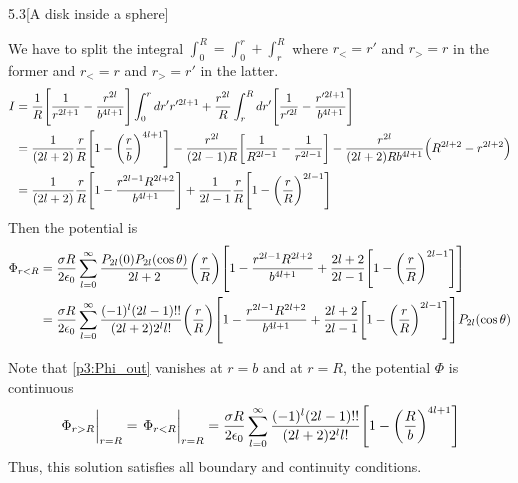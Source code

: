 \documentclass[12pt]{article}
\begin{document}
\begin{problem}{5.3}[A disk inside a sphere]
\begin{solution}
We have to split the integral $\int_0^R=\int_0^r+\int_r^R$ where $r_< =r'$ and
$r_> =r$ in the former and $r_< =r$ and $r_> =r'$ in the latter.
\begin{align}
    I
    &=\frac1R\qty[\frac1{r^{2l+1}}-\frac{r^{2l}}{b^{4l+1}}]\int_0^rdr' r'^{2l+1}
    +\frac{r^{2l}}{R}\int_r^R
    dr'\qty[\frac1{r'^{2l}}-\frac{r'^{2l+1}}{b^{4l+1}}]\notag\\
    &=\frac1{(2l+2)}\frac{r}{R}\qty[1-\qty(\frac{r}{b})^{4l+1}]
    -\frac{r^{2l}}{(2l-1)R}\qty[\frac1{R^{2l-1}}-\frac1{r^{2l-1}}]
    -\frac{r^{2l}}{(2l+2)Rb^{4l+1}}\qty(R^{2l+2}-r^{2l+2})\notag\\
    &=\frac{1}{(2l+2)}\frac{r}{R}\qty[1-\frac{r^{2l-1}R^{2l+2}}{b^{4l+1}}]
    +\frac1{2l-1}\frac{r}{R}\qty[1-\qty(\frac{r}{R})^{2l-1}]
\end{align}
Then the potential is
\begin{align}\label{p3:Phi_in}
    \Phi_{r<R}&=\frac{\sigma R}{2\epsilon_0}\sum_{l=0}^\infty
        \frac{P_{2l}(0)P_{2l}(\cos\theta)}{2l+2}\qty(\frac{r}{R})
            \qty[1-\frac{r^{2l-1}R^{2l+2}}{b^{4l+1}}+\frac{2l+2}{2l-1}\qty[1-\qty(\frac{r}{R})^{2l-1}]]\notag\\
    &=\frac{\sigma R}{2\epsilon_0}\sum_{l=0}^\infty
    \frac{(-1)^l(2l-1)!!}{(2l+2)2^ll!}\qty(\frac{r}{R})
    \qty[1-\frac{r^{2l-1}R^{2l+2}}{b^{4l+1}}+\frac{2l+2}{2l-1}\qty[1-\qty(\frac{r}{R})^{2l-1}]]P_{2l}(\cos\theta)
\end{align}

Note that \eqref{p3:Phi_out} vanishes at $r=b$ and at $r=R$, the potential
$\Phi$ is continuous
\begin{equation}
    \eval{\Phi_{r>R}}_{r=R}=\eval{\Phi_{r<R}}_{r=R}
    =\frac{\sigma R}{2\epsilon_0}\sum_{l=0}^\infty
    \frac{(-1)^l(2l-1)!!}{(2l+2)2^ll!}\qty[1-\qty(\frac{R}{b})^{4l+1}]
\end{equation}
Thus, this solution satisfies all boundary and continuity conditions.
\end{solution}
\end{problem}
\end{document}
